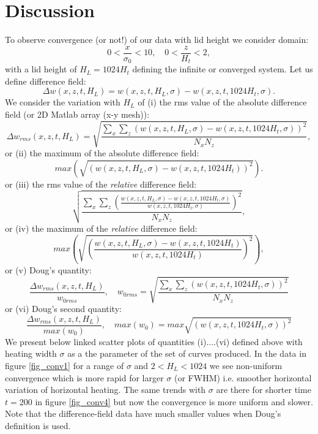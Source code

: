 \documentclass[12pt]{article}
\begin{document}
\section{Discussion}
%
To observe convergence (or not!) of our data with lid height we consider domain:
%
\begin{equation}
0<\frac{x}{\sigma_0}<10, \quad 0<\frac{z}{H_t}<2,
\end{equation}
% 
with a lid height of $H_L = 1024H_t$ defining the infinite or converged system. Let us define difference field:
%
\begin{equation}
\Delta w (x,z,t,H_L) = w(x,z,t,H_L,\sigma) - w(x,z,t,1024H_t,\sigma).
\end{equation}
%
We consider the variation with $H_L$ of (i) the rms value of the absolute difference field (or 2D Matlab array (x-y mesh)):
%
\begin{equation}
\Delta w_{rms} (x,z,t,H_L) = \sqrt{  \frac{ \sum_{x} \sum_{z} \left(  w(x,z,t,H_L,\sigma) - w(x,z,t,1024H_t,\sigma)  \right)^2 } { N_x N_z} }, 
\end{equation}
%
or (ii) the maximum of the absolute difference field:
%
\begin{equation}
 max \left(  \sqrt{ \left( w(x,z,t,H_L,\sigma) - w(x,z,t,1024H_t)  \right)^2 } \right).
\end{equation}
%
or (iii) the  rms value  of the \emph{ relative } difference field:
%
\begin{equation}
 \sqrt{  \frac{ \sum_{x} \sum_{z} \left(  \frac{w(x,z,t,H_L,\sigma) - w(x,z,t,1024H_t,\sigma)}{w(x,z,t,1024H_t,\sigma)} \right)^2 } { N_x N_z} },
\end{equation}
%
or (iv) the maximum of the \emph{ relative } difference field:
%
\begin{equation}
max \left(  \sqrt{ \left(  \frac{ w(x,z,t,H_L,\sigma) - w(x,z,t,1024H_t) }{ w(x,z,t,1024H_t) } \right)^2 } \right),
\end{equation}
%
or (v) Doug's quantity:
%
\begin{equation}
 \frac{ \Delta w_{rms} (x,z,t,H_L) } { w_{0 rms} }, \quad w_{0 rms} = \sqrt{  \frac{ \sum_{x} \sum_{z} \left(  w(x,z,t,1024H_t,\sigma)  \right)^2 } { N_x N_z} }
\end{equation}
or (vi) Doug's second quantity:
%
\begin{equation}
 \frac{ \Delta w_{rms} (x,z,t,H_L) } {max ( w_0 ) }, \quad max( w_0 ) =max \sqrt{   \left(  w(x,z,t,1024H_t,\sigma)  \right)^2  }
\end{equation}
% 
We present below linked scatter plots of quantities (i)....(vi) defined above with heating width $\sigma$ as a the parameter of the set of curves produced.  In the data in figure \ref{fig_conv1} for a range of $\sigma$ and $2<H_L<1024$ we see non-uniform convergence which is more rapid for larger $\sigma$ (or FWHM) i.e. smoother horizontal variation of horizontal heating. The same trends with $\sigma$ are there for shorter time $t=200$ in figure \ref{fig_conv4} but now the convergence is more uniform and slower. Note that the difference-field data have much smaller values when Doug's definition is used. 
\end{document}
